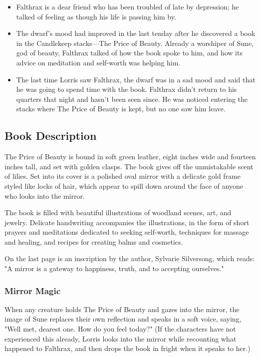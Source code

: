 \documentclass[10pt,a4paper,twoside,bg=print,twocolumn,openany,nodeprecatedcode]{dndbook}
\begin{document}
\begin{itemize}
\item Falthrax is a dear friend who has been troubled of late by depression; he talked of feeling as though his life is passing him by.
\item The dwarf's mood had improved in the last tenday after he discovered a book in the Candlekeep stacks—The Price of Beauty. Already a worshiper of Sune, god of beauty, Falthrax talked of how the book spoke to him, and how its advice on meditation and self-worth was helping him.
\item The last time Lorris saw Falthrax, the dwarf was in a sad mood and said that he was going to spend time with the book. Falthrax didn't return to his quarters that night and hasn't been seen since. He was noticed entering the stacks where The Price of Beauty is kept, but no one saw him leave.
\end{itemize}

\subsection{Book Description}
The Price of Beauty is bound in soft green leather, eight inches wide and fourteen inches tall, and set with golden clasps. The book gives off the unmistakable scent of lilies. Set into its cover is a polished oval mirror with a delicate gold frame styled like locks of hair, which appear to spill down around the face of anyone who looks into the mirror.

The book is filled with beautiful illustrations of woodland scenes, art, and jewelry. Delicate handwriting accompanies the illustrations, in the form of short prayers and meditations dedicated to seeking self-worth, techniques for massage and healing, and recipes for creating balms and cosmetics.

On the last page is an inscription by the author, Sylvarie Silversong, which reads: "A mirror is a gateway to happiness, truth, and to accepting ourselves."

\subsubsection{Mirror Magic}
When any creature holds The Price of Beauty and gazes into the mirror, the image of Sune replaces their own reflection and speaks in a soft voice, saying, "Well met, dearest one. How do you feel today?" (If the characters have not experienced this already, Lorris looks into the mirror while recounting what happened to Falthrax, and then drops the book in fright when it speaks to her.)
\end{document}
